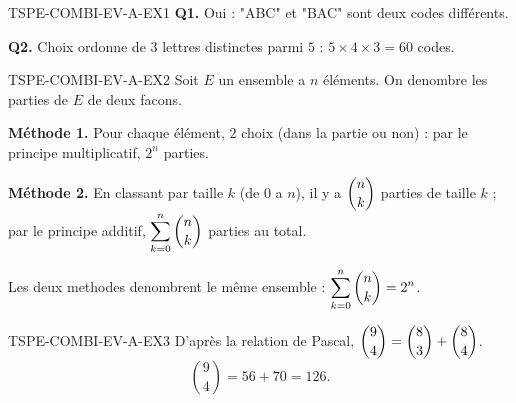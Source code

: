 \begin{corrige}{TSPE-COMBI-EV-A-EX1}
\textbf{Q1.} Oui : "ABC" et "BAC" sont deux codes différents.

\textbf{Q2.} Choix ordonne de $3$ lettres distinctes parmi $5$ : $5 \times 4 \times 3 = \boxed{60}$ codes.
\end{corrige}

\begin{corrige}{TSPE-COMBI-EV-A-EX2}
Soit $E$ un ensemble a $n$ éléments. On denombre les parties de $E$ de deux facons.

\textbf{Méthode 1.} Pour chaque élément, $2$ choix (dans la partie ou non) : par le principe multiplicatif, $2^n$ parties.

\textbf{Méthode 2.} En classant par taille $k$ (de $0$ a $n$), il y a $\dbinom{n}{k}$ parties de taille $k$ ; par le principe additif, $\displaystyle\sum_{k=0}^n \dbinom{n}{k}$ parties au total.

Les deux methodes denombrent le même ensemble : $\displaystyle\sum_{k=0}^{n}\dbinom{n}{k} = 2^n$.
\end{corrige}

\begin{corrige}{TSPE-COMBI-EV-A-EX3}
D'après la relation de Pascal, $\dbinom{9}{4} = \dbinom{8}{3}+\dbinom{8}{4}$.
\[
  \binom{9}{4} = 56+70 = \boxed{126}.
\]
\end{corrige}
